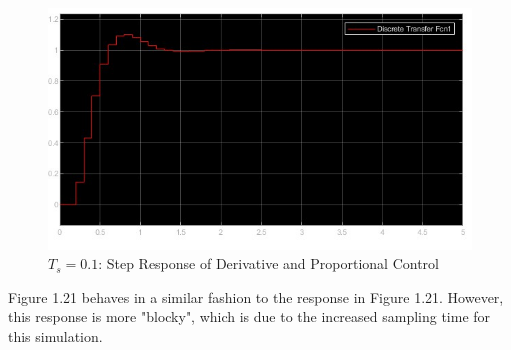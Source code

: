 \documentclass[stu, a4paper, 12pt, floatsintext]{apa7}
\numberwithin{figure}{section}
\numberwithin{table}{section}
\numberwithin{equation}{section}
\begin{document}
\begin{figure}[H]
    \caption{$T_s = 0.1$: Step Response of Derivative and Proportional Control}
    \label{fig:0.1_Ts_step3_step_response}
    \centering
    \includegraphics[width=1.1\textwidth]{pictures/task3_0.1_step_response.jpg}
\end{figure}
Figure 1.21 behaves in a similar fashion to the response in Figure 1.21. However, this response is more "blocky", which is due to the increased sampling time for this simulation.
\end{document}
